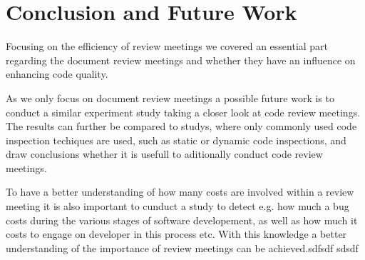 \section{Conclusion and Future Work}

Focusing on the efficiency of review meetings we covered an essential part regarding the document review meetings and whether they have an influence on enhancing code quality.  

As we only focus on document review meetings a possible future work is to conduct a similar experiment study taking a closer look at code review meetings. The results can further be compared to studys, where only commonly used code inspection techiques are used, such as static or dynamic code inspections, and draw conclusions whether it is usefull to aditionally conduct code review meetings.   

To have a better understanding of how many costs are involved within a review meeting it is also important to cunduct a study to detect e.g. how much a bug costs during the various stages of software developement, as well as how much it costs to engage on developer in this process etc. With this knowledge a better understanding of the importance of review meetings can be achieved.sdfsdf
sdsdf     